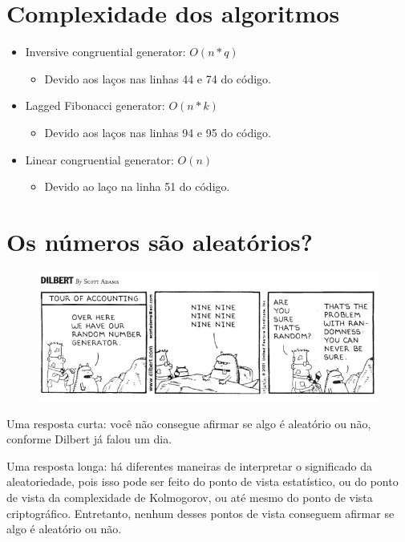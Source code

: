 \documentclass[12pt]{article}
\begin{document}
\section{Complexidade dos algoritmos}
\begin{itemize}
  \item Inversive congruential generator: $O(n * q)$
  \begin{itemize}
    \item Devido aos laços nas linhas 44 e 74 do código.
  \end{itemize}
  \item Lagged Fibonacci generator: $O(n * k)$
  \begin{itemize}
    \item Devido aos laços nas linhas 94 e 95 do código.
  \end{itemize}
  \item Linear congruential generator: $O(n)$
    \begin{itemize}
      \item Devido ao laço na linha 51 do código.
    \end{itemize}
\end{itemize}

\section{Os números são aleatórios?}
\begin{figure}[h]
  \includegraphics[width=\linewidth]{dilbert}
\end{figure}

Uma resposta curta: você não consegue afirmar se algo é aleatório ou não,
conforme Dilbert já falou um dia.

Uma resposta longa: há diferentes maneiras de interpretar o significado da
aleatoriedade, pois isso pode ser feito do ponto de vista estatístico, ou do
ponto de vista da complexidade de Kolmogorov, ou até mesmo do ponto de vista
criptográfico. Entretanto, nenhum desses pontos de vista conseguem afirmar se
algo é aleatório ou não.
\end{document}
